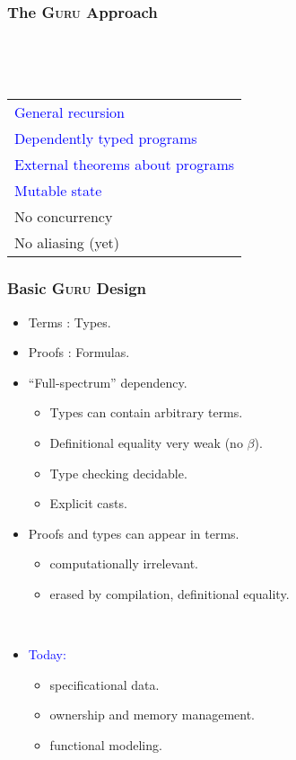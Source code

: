\documentclass[11pt]{beamer}
\begin{document}
\begin{frame}
  \frametitle{The \textsc{Guru} Approach}

\begin{center}

\ 

\ \ \ \ \ \ \ \ \ \ \ \ \ \ \ \ \ \ \ 
\begin{tabular}{l}
\textcolor{blue}{General recursion} \\
\textcolor{blue}{Dependently typed programs} \\
\textcolor{blue}{External theorems about programs }\\
\textcolor{blue}{Mutable state} \\
No concurrency \\ 
No aliasing (yet)
\end{tabular}

\end{center}

\end{frame}

\begin{frame}
  \frametitle{Basic \textsc{Guru} Design}

\begin{itemize}

\item Terms : Types.
\item Proofs : Formulas.
\item ``Full-spectrum'' dependency.
\begin{itemize}
\item Types can contain arbitrary terms.
\item Definitional equality very weak (no $\beta$).
\item Type checking decidable.
\item Explicit casts.
\end{itemize}
\item Proofs and types can appear in terms.
\begin{itemize}
\item computationally irrelevant.
\item erased by compilation, definitional equality.
\end{itemize}

\ 

\item \textcolor{blue}{Today:} 
\begin{itemize}

\item specificational data.
\item ownership and memory management.
\item functional modeling.

\end{itemize}

\end{itemize}


\end{frame}
\end{document}
